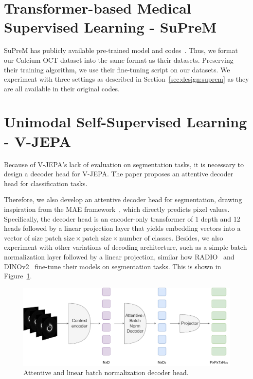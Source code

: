 \documentclass[a4paper,11pt,oneside]{report}
\begin{document}
\section{Transformer-based Medical Supervised Learning - SuPreM}
SuPreM has publicly available pre-trained model and codes~\cite{Li2024}. Thus, we format our Calcium OCT dataset into the same format as their datasets. Preserving their training algorithm, we use their fine-tuning script on our datasets. We experiment with three settings as described in Section~\ref{sec:design:suprem} as they are all available in their original codes.

\section{Unimodal Self-Supervised Learning - V-JEPA}\label{sec:implementation:vjepa}
Because of V-JEPA's lack of evaluation on segmentation tasks, it is necessary to design a decoder head for V-JEPA. The paper proposes an attentive decoder head for classification tasks. 

Therefore, we also develop an attentive decoder head for segmentation, drawing inspiration from the MAE framework~\cite{He2022}, which directly predicts pixel values. Specifically, the decoder head is an encoder-only transformer of 1 depth and 12 heads followed by a linear projection layer that yields embedding vectors into a vector of size \(\text{patch size} \times \text{patch size} \times \text{number of classes}\). Besides, we also experiment with other variations of decoding architecture, such as a simple batch normalization layer followed by a linear projection, similar how RADIO~\cite{Ranzinger2024RADIO} and DINOv2~\cite{Oquab2024dinov} fine-tune their models on segmentation tasks. This is shown in Figure~\ref{fig:vjepa-attentive-and-batchnorm-decoder-head}. 

\begin{figure}[ht]
    \centering
    \includegraphics[width=0.6\linewidth]{figures/fig_implementation_vjepa_attentive_and_batchnorm_decoder.pdf}
    \caption{Attentive and linear batch normalization decoder head.}
    \label{fig:vjepa-attentive-and-batchnorm-decoder-head}
\end{figure}%
\end{document}
